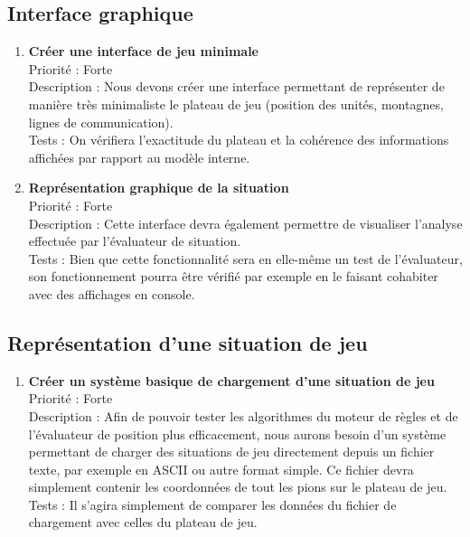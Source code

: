 \documentclass[12pt]{article}
\begin{document}
		\subsection{Interface graphique}

			\begin{enumerate}

				\item \textbf{Créer une interface de jeu minimale} 
				\\[0.7\baselineskip]
				Priorité : Forte 
				\\[0.7\baselineskip]
				Description : Nous devons créer une interface permettant de représenter de manière très minimaliste le plateau de jeu (position des unités, 
				montagnes, lignes de communication). 
				\\[0.7\baselineskip]
				Tests : On vérifiera l'exactitude du plateau et la cohérence des informations affichées par rapport au modèle interne. 
				\\[0.7\baselineskip]

				\item \textbf{Représentation graphique de la situation} 
				\\[0.7\baselineskip]
				Priorité : Forte 
				\\[0.7\baselineskip]
				Description : Cette interface devra également permettre de visualiser l'analyse effectuée par l'évaluateur de situation. 
				\\[0.7\baselineskip]
				Tests : Bien que cette fonctionnalité sera en elle-même un test de l'évaluateur, son fonctionnement pourra être vérifié par exemple en 
				le faisant cohabiter avec des affichages en console. 
				\\[0.7\baselineskip]

				
			\end{enumerate}

		\subsection{Représentation d'une situation de jeu}

			\begin{enumerate}

				\item \textbf{Créer un système basique de chargement d'une situation de jeu} 
				\\[0.7\baselineskip]
				Priorité : Forte 
				\\[0.7\baselineskip]
				Description : Afin de pouvoir tester les algorithmes du moteur de règles et de l'évaluateur de position plus efficacement, nous aurons besoin 
				d'un système permettant de charger des situations de jeu directement depuis un fichier texte, par exemple en ASCII ou autre format simple. 
				Ce fichier devra simplement contenir les coordonnées de tout les pions sur le plateau de jeu. 
				\\[0.7\baselineskip]
				Tests : Il s'agira simplement de comparer les données du fichier de chargement avec celles du plateau de jeu. 
				\\[0.7\baselineskip]
				
			\end{enumerate}
\end{document}
